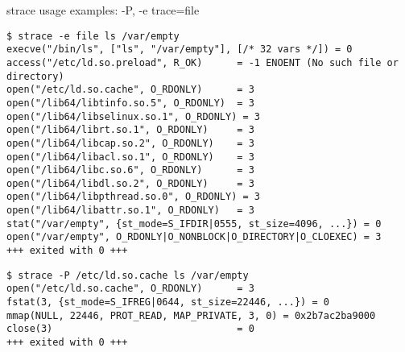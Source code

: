 
\begin{frame}[fragile]{strace usage examples: -P, -e trace=file}
\scriptsize
\begin{verbatim}
$ strace -e file ls /var/empty
execve("/bin/ls", ["ls", "/var/empty"], [/* 32 vars */]) = 0
access("/etc/ld.so.preload", R_OK)      = -1 ENOENT (No such file or directory)
open("/etc/ld.so.cache", O_RDONLY)      = 3
open("/lib64/libtinfo.so.5", O_RDONLY)  = 3
open("/lib64/libselinux.so.1", O_RDONLY) = 3
open("/lib64/librt.so.1", O_RDONLY)     = 3
open("/lib64/libcap.so.2", O_RDONLY)    = 3
open("/lib64/libacl.so.1", O_RDONLY)    = 3
open("/lib64/libc.so.6", O_RDONLY)      = 3
open("/lib64/libdl.so.2", O_RDONLY)     = 3
open("/lib64/libpthread.so.0", O_RDONLY) = 3
open("/lib64/libattr.so.1", O_RDONLY)   = 3
stat("/var/empty", {st_mode=S_IFDIR|0555, st_size=4096, ...}) = 0
open("/var/empty", O_RDONLY|O_NONBLOCK|O_DIRECTORY|O_CLOEXEC) = 3
+++ exited with 0 +++
\end{verbatim}

\begin{verbatim}
$ strace -P /etc/ld.so.cache ls /var/empty
open("/etc/ld.so.cache", O_RDONLY)      = 3
fstat(3, {st_mode=S_IFREG|0644, st_size=22446, ...}) = 0
mmap(NULL, 22446, PROT_READ, MAP_PRIVATE, 3, 0) = 0x2b7ac2ba9000
close(3)                                = 0
+++ exited with 0 +++
\end{verbatim}
\end{frame}

